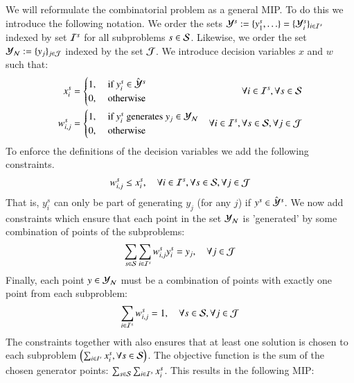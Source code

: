 \begin{enumerate}
We will reformulate the combinatorial problem as a general MIP. To do this we introduce the following notation. We order the sets $\Y^s := \{y^s_1,\hdots\} = \{\Y_i^s\}_{i \in \I^s}$ indexed by set $\I^s$ for all subproblems $ s \in \S$. Likewise, we order the set $\Yn := \{y_j\}_{j \in \J}$ indexed by the set $\J$. We introduce decision variables $x$ and $w$ such that:
\begin{align}
	x^s_i &= \begin{cases}
    	1, &\text{ if }y_i^s \in \hY^s \\ 
    	0, &\text{ otherwise }\\ 
    \end{cases}
    & \forall i \in \I^s, \forall s \in \S
    \\
		w^s_{i,j} &= \begin{cases}
    	1, &\text{ if $y^s_i$ generates $y_j \in \Yn$} \\ 
    	0, &\text{ otherwise }\\ 
    \end{cases}
    & \forall i \in \I^s, \forall s \in \S, \forall j \in \J \nonumber
\end{align}
To enforce the definitions of the decision variables we add the following constraints.
\begin{align}
    w^s_{i,j} \le x^s_i, \quad \forall i \in \I^s, \forall s \in \S, \forall j \in \J \label{constr:MIP-subset-chosen}
\end{align}
That is, $y^s_i$ can only be part of generating $y_j$ (for any $j$) if $y^s \in \hY^s$. We now add constraints which ensure that each point in the set $\Yn$ is 'generated' by some combination of points of the subproblems:
\begin{align}
    \sum_{s \in \S}\sum_{i \in \I^s} w^s_{i,j} y^s_i = y_j, \quad \forall j \in \J \label{constr:MIP-generating}
\end{align}
Finally, each point $y \in \Yn$ must be a combination of points with exactly one point from each subproblem:
\begin{align}
    \sum_{i \in \I^s} w^s_{i,j} = 1, \quad \forall s \in \S, \forall j \in \J \label{constr:MIP-combination-single}
\end{align}
The constraints  together with  also ensures that at least one solution is chosen to each subproblem $\left( \sum_{i \in I^s} x^s_i,  \forall s \in \S \right)$.
The objective function is the sum of the chosen generator points: $\sum_{s \in \S}\sum_{i \in \I^s} x^s_i$. This results in the following MIP:


\end{enumerate}
